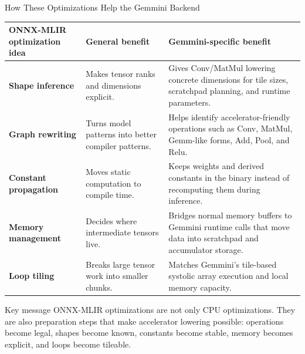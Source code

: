 \documentclass[aspectratio=169,10pt]{beamer}
\newcommand{\edgeword}[1]{\textcolor{red!75!black}{\textbf{#1}}}
\begin{document}
\begin{frame}{How These Optimizations Help the Gemmini Backend}
  \scriptsize
  \begin{tabularx}{\textwidth}{@{}lXX@{}}
    \toprule
    ONNX-MLIR optimization idea & General benefit & Gemmini-specific benefit \\
    \midrule
    \edgeword{Shape inference} &
      Makes tensor ranks and dimensions explicit. &
      Gives Conv/MatMul lowering concrete dimensions for tile sizes, scratchpad planning, and runtime parameters. \\
    \edgeword{Graph rewriting} &
      Turns model patterns into better compiler patterns. &
      Helps identify accelerator-friendly operations such as Conv, MatMul, Gemm-like forms, Add, Pool, and Relu. \\
    \edgeword{Constant propagation} &
      Moves static computation to compile time. &
      Keeps weights and derived constants in the binary instead of recomputing them during inference. \\
    \edgeword{Memory management} &
      Decides where intermediate tensors live. &
      Bridges normal memory buffers to Gemmini runtime calls that move data into scratchpad and accumulator storage. \\
    \edgeword{Loop tiling} &
      Breaks large tensor work into smaller chunks. &
      Matches Gemmini's tile-based systolic array execution and local memory capacity. \\
    \bottomrule
  \end{tabularx}

  \vspace{0.45em}
  \begin{block}{Key message}
    ONNX-MLIR optimizations are not only CPU optimizations. They are also preparation steps that make accelerator lowering possible: operations become legal, shapes become known, constants become stable, memory becomes explicit, and loops become tileable.
  \end{block}
\end{frame}
\end{document}
